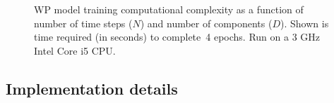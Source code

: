 \begin{figure}[t]
  \centering
  \caption{
    WP model training computational complexity as a function of number of time steps ($N$) and number of components ($D$).
    Shown is time required (in seconds) to complete~4 epochs.
    Run on a 3 GHz Intel Core i5 CPU.
  }\label{fig:wp-computational-cost}
\end{figure}


\subsection{Implementation details}

